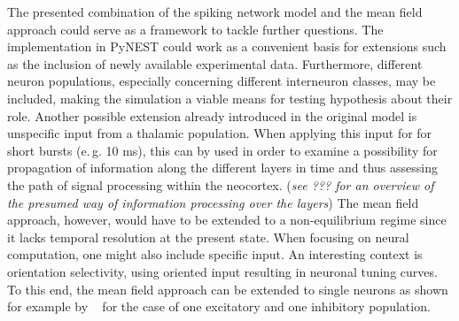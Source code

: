The presented combination of the spiking network model and the mean field approach
could serve as a framework to tackle further questions. 
The implementation in PyNEST could work as a convenient basis for extensions 
such as the inclusion of newly available experimental data.
Furthermore, different neuron populations, 
especially concerning different interneuron classes, may be included, 
making the simulation a viable means for testing hypothesis about their 
role. 
Another possible extension already introduced in the 
original model \cite{potjans2014} is unspecific input from a thalamic population. 
When applying this input for for short bursts (e.\,g. 10 ms), 
this can by used in order to examine a possibility for propagation of information
along the different layers in time and thus assessing the 
path of signal processing within the neocortex.
(\emph{see ??? for an overview of 
the presumed way of information processing over the layers})
The mean field approach, however, would have to be extended to a non-equilibrium 
regime since it lacks temporal resolution at the present state. 
When focusing on neural computation, one might also include specific input.
An interesting context is orientation selectivity, using 
oriented input resulting in neuronal tuning curves.
To this end, the mean field approach can be extended to single neurons 
as shown for example by ~ 
for the case of one excitatory and one inhibitory population.




